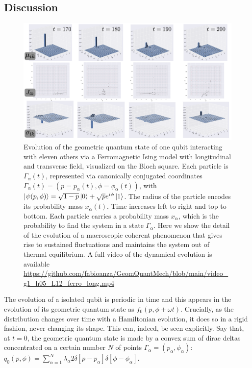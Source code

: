 \documentclass[draft,nofootinbib,pre,twocolumn,showpacs,showkeys,preprintnumbers,floatfix]{revtex4-1}
\newcommand{\1}{\mathbbm{1}}
\begin{document}
\subsection*{Discussion}
\begin{figure}[t!]
\centering
\includegraphics[width=.9\textwidth]{./img/summary.pdf}
\caption{Evolution of the geometric quantum state of one qubit interacting with 
	eleven others via a Ferromagnetic Ising model with longitudinal and transverse field, 
	visualized on the Bloch square. Each particle is $\Gamma_\alpha(t)$, represented via
	canonically conjugated coordinates $\Gamma_\alpha(t) = \left( p=p_\alpha(t),\phi=\phi_\alpha(t)\right)$, with $\ket{\psi(p,\phi)} = 
	\sqrt{1-p} \ket{0}+ \sqrt{p} e^{i\phi}\ket{1}$. The radius of the particle encodes its 
	probability mass $x_\alpha(t)$. Time increases left to right and top to bottom. Each particle
	carries a probability mass $x_\alpha$, which is the probability to find the system in a 
	state $\Gamma_\alpha$. Here we show the detail of the evolution of a macroscopic 
	coherent phenomenon that gives rise to sustained fluctuations and maintains the
	system out of thermal equilibrium. A full video of the dynamical evolution is available 
	\url{https://github.com/fabioanza/GeomQuantMech/blob/main/video_g1_h05_L12_ferro_long.mp4}
	}
\label{fig:summary}
\end{figure}
The evolution of a isolated qubit is periodic in time and this appears in the evolution 
of its geometric quantum state as $f_0(p,\phi+\omega t)$. Crucially, as the 
distribution changes over time with a Hamiltonian evolution, it does so in a 
rigid fashion, never changing its shape. This can, indeed, be seen explicitly. 
Say that, at $t=0$, the geometric quantum state is made by a convex sum
of dirac deltas concentrated on a certain number $N$ of points $\Gamma_\alpha = (p_\alpha,\phi_\alpha)$: 
$q_0(p,\phi) = \sum_{\alpha=1}^N \lambda_\alpha 2\delta\left[ p-p_\alpha\right] \delta\left[ \phi-\phi_\alpha\right]$.
\end{document}
